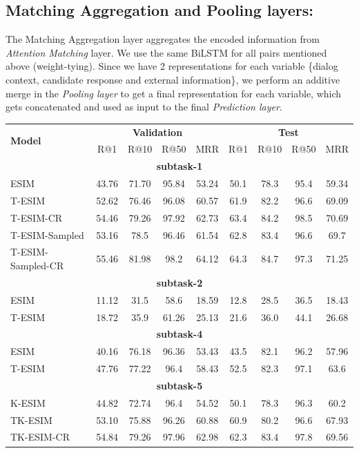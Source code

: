 \documentclass[letterpaper]{article} %
\begin{document}
\subsection{Matching Aggregation and Pooling layers:}
The Matching Aggregation layer aggregates the encoded information from \textit{Attention Matching} layer. We use the same BiLSTM for all pairs mentioned above (weight-tying). Since we have 2 representations for each variable \{dialog context, candidate response and external information\}, we perform an additive merge in the \textit{Pooling layer} to get a final representation for each variable, which gets concatenated and used as input to the final \textit{Prediction layer}.

\begin{table}[htbp!]
\begin{center}
\begin{tabular}{lcccc|cccc}
\hline
\multirow{2}{*}{\textbf{Model}} & \multicolumn{4}{c}{\textbf{Validation}} & \multicolumn{4}{c}{\textbf{Test}}\\
& R@1 & R@10 & R@50 & MRR & R@1 & R@10 & R@50 & MRR  \\ \hline
\multicolumn{9}{c}{\textbf{subtask-1}}\\\hline
ESIM & 43.76 & 71.70 & 95.84 & 53.24 &  50.1 & 78.3 & 95.4 & 59.34 \\ \hline
T-ESIM & 52.62 & 76.46 & 96.08 & 60.57 & 61.9 & 82.2 & 96.6 & 69.09\\ \hline
T-ESIM-CR & 54.46 & 79.26 & 97.92 & 62.73 & 63.4 & 84.2 & 98.5 & 70.69\\ \hline
T-ESIM-Sampled & 53.16 & 78.5 & 96.46 & 61.54 & 62.8 & 83.4 & 96.6 & 69.7\\ \hline
T-ESIM-Sampled-CR & 55.46 & 81.98 & 98.2 & 64.12 & 64.3 & 84.7 & 97.3 & 71.25\\ \hline
\multicolumn{9}{c}{\textbf{subtask-2}}\\\hline
ESIM & 11.12 & 31.5 & 58.6 & 18.59 &  12.8 & 28.5 & 36.5 & 18.43 \\ \hline
T-ESIM & 18.72 & 35.9 & 61.26 & 25.13 & 21.6 & 36.0 & 44.1 & 26.68 \\ \hline
\multicolumn{9}{c}{\textbf{subtask-4}}\\\hline
ESIM & 40.16 & 76.18 & 96.36 & 53.43 &  43.5 & 82.1 & 96.2 & 57.96 \\ \hline
T-ESIM & 47.76 & 77.22 & 96.4 & 58.43 & 52.5 & 82.3 & 97.1 & 63.6 \\ \hline
\multicolumn{9}{c}{\textbf{subtask-5}}\\\hline
K-ESIM & 44.82 & 72.74 & 96.4 & 54.52 &  50.1 & 78.3 & 96.3 & 60.2 \\ \hline
TK-ESIM & 53.10 & 75.88 & 96.26 & 60.88 & 60.9 & 80.2 & 96.6 & 67.93 \\ \hline
TK-ESIM-CR & 54.84 & 79.26 & 97.96 & 62.98 & 62.3 & 83.4 & 97.8 & 69.56\\ \hline


\end{tabular}
\end{center}
\end{table}
\end{document}
